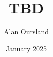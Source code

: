\documentclass[11pt]{article}
\title{TBD}
\author{Alan Oursland}
\affil{\textit{alan.oursland@gmail.com}}
\date{January 2025}
\begin{document}
\maketitle

\begin{abstract}

\end{abstract}





% 



% 
% 


% 
% 
% 
\end{document}
